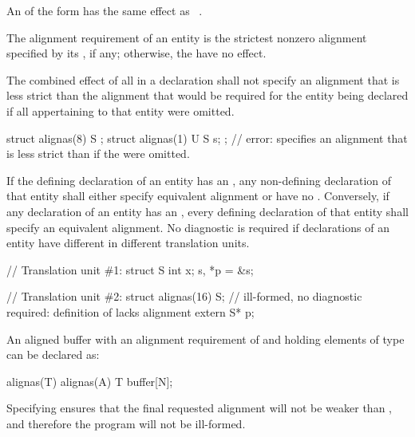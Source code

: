 \pnum
An  of the form
  \tcode{)} has the same
effect as  ~\tcode{))}.

\pnum
The alignment requirement of an entity is the strictest nonzero alignment
specified by its , if any;
otherwise, the  have no effect.

\pnum
The combined effect of all  in a declaration shall not
specify an alignment that is less strict than the alignment that would
be required for the entity being declared if all 
appertaining to that entity
were omitted.
\begin{example}
\begin{codeblock}
struct alignas(8) S {};
struct alignas(1) U {
  S s;
};  // error:  specifies an alignment that is less strict than if the  were omitted.
\end{codeblock}
\end{example}

\pnum
If the defining declaration of an entity has an
, any non-defining
declaration of that entity shall either specify equivalent alignment or have no
.
Conversely, if any declaration of an entity has an
,
every defining
declaration of that entity shall specify an equivalent alignment.
No diagnostic is required if declarations of an entity have
different 
in different translation units.
\begin{example}
\begin{codeblock}
// Translation unit \#1:
struct S { int x; } s, *p = &s;

// Translation unit \#2:
struct alignas(16) S;           // ill-formed, no diagnostic required: definition of  lacks alignment
extern S* p;
\end{codeblock}
\end{example}

\pnum
\begin{example}
An aligned buffer with an alignment requirement
of  and holding  elements of type 
can be declared as:
\begin{codeblock}
alignas(T) alignas(A) T buffer[N];
\end{codeblock}
Specifying  ensures
that the final requested alignment will not be weaker than ,
and therefore the program will not be ill-formed.
\end{example}


